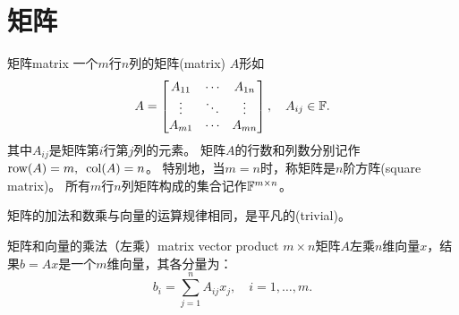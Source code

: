 
\section{矩阵}
\begin{definition}{矩阵}{matrix}
    一个$m$行$n$列的矩阵(matrix) $A$形如
    \[
        A=\begin{bmatrix}
            A_{11}&\cdots&A_{1n}\\
            \vdots&\ddots&\vdots\\
            A_{m1}&\cdots&A_{mn}
        \end{bmatrix},\quad A_{ij}\in\mathbb F.
    \]
    其中$A_{ij}$是矩阵第$i$行第$j$列的元素。
    矩阵$A$的行数和列数分别记作$\operatorname{row}(A)=m,\enspace\operatorname{col}(A)=n$。
	特别地，当$m=n$时，称矩阵是$n$阶方阵(square matrix)。
    \tcblower
	所有$m$行$n$列矩阵构成的集合记作$\mathbb F^{m\times n}$。
\end{definition}

矩阵的加法和数乘与向量的运算规律相同，是平凡的(trivial)。

\begin{definition}
	{矩阵和向量的乘法（左乘）}{matrix vector product}
	$m\times n$矩阵$A$左乘$n$维向量$x$，结果$b=Ax$是一个$m$维向量，其各分量为：
	\begin{equation}
		b_i=\sum_{j=1}^nA_{ij}x_j,\quad i=1,\ldots,m.
	\end{equation}
\end{definition}

